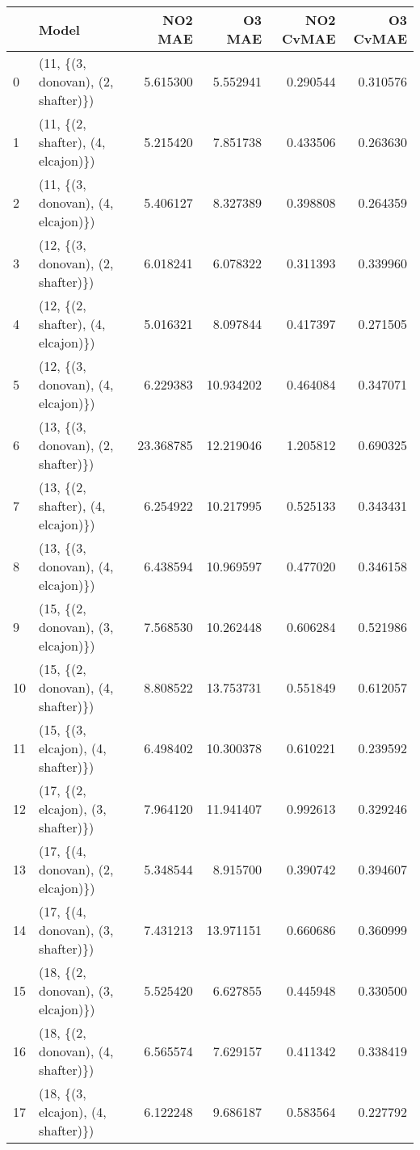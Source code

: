 \begin{tabular}{llrrrr}
\toprule
{} &                               Model &    NO2 MAE &     O3 MAE &  NO2 CvMAE &  O3 CvMAE \\
\midrule
0  &  (11, \{(3, donovan), (2, shafter)\}) &   5.615300 &   5.552941 &   0.290544 &  0.310576 \\
1  &  (11, \{(2, shafter), (4, elcajon)\}) &   5.215420 &   7.851738 &   0.433506 &  0.263630 \\
2  &  (11, \{(3, donovan), (4, elcajon)\}) &   5.406127 &   8.327389 &   0.398808 &  0.264359 \\
3  &  (12, \{(3, donovan), (2, shafter)\}) &   6.018241 &   6.078322 &   0.311393 &  0.339960 \\
4  &  (12, \{(2, shafter), (4, elcajon)\}) &   5.016321 &   8.097844 &   0.417397 &  0.271505 \\
5  &  (12, \{(3, donovan), (4, elcajon)\}) &   6.229383 &  10.934202 &   0.464084 &  0.347071 \\
6  &  (13, \{(3, donovan), (2, shafter)\}) &  23.368785 &  12.219046 &   1.205812 &  0.690325 \\
7  &  (13, \{(2, shafter), (4, elcajon)\}) &   6.254922 &  10.217995 &   0.525133 &  0.343431 \\
8  &  (13, \{(3, donovan), (4, elcajon)\}) &   6.438594 &  10.969597 &   0.477020 &  0.346158 \\
9  &  (15, \{(2, donovan), (3, elcajon)\}) &   7.568530 &  10.262448 &   0.606284 &  0.521986 \\
10 &  (15, \{(2, donovan), (4, shafter)\}) &   8.808522 &  13.753731 &   0.551849 &  0.612057 \\
11 &  (15, \{(3, elcajon), (4, shafter)\}) &   6.498402 &  10.300378 &   0.610221 &  0.239592 \\
12 &  (17, \{(2, elcajon), (3, shafter)\}) &   7.964120 &  11.941407 &   0.992613 &  0.329246 \\
13 &  (17, \{(4, donovan), (2, elcajon)\}) &   5.348544 &   8.915700 &   0.390742 &  0.394607 \\
14 &  (17, \{(4, donovan), (3, shafter)\}) &   7.431213 &  13.971151 &   0.660686 &  0.360999 \\
15 &  (18, \{(2, donovan), (3, elcajon)\}) &   5.525420 &   6.627855 &   0.445948 &  0.330500 \\
16 &  (18, \{(2, donovan), (4, shafter)\}) &   6.565574 &   7.629157 &   0.411342 &  0.338419 \\
17 &  (18, \{(3, elcajon), (4, shafter)\}) &   6.122248 &   9.686187 &   0.583564 &  0.227792 \\

\end{tabular}
